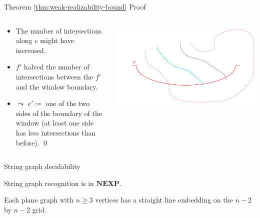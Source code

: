 \documentclass[10pt,aspectratio=169]{beamer}
\theoremstyle{plain}
\begin{document}
\begin{frame}{Theorem \ref{thm:weak-realizability-bound} Proof}
    \begin{columns}
    \begin{column}{0.35\textwidth}
        \begin{itemize}
            \item The number of intersections along \(e\) might have increased.
            \item<2-> \(f'\) halved the number of intersections between the \(f'\) and the window boundary. 
            \item<3-> \(\leadsto\) \(e' \coloneqq\) one of the two sides of the boundary of the window (at least one side has less intersections than before). \qed
        \end{itemize}
    \end{column}
    \begin{column}{0.65\textwidth}
        \begin{center}
            \includegraphics[width=\textwidth]{images/figure-10.pdf}
        \end{center}
    \end{column}
    \end{columns}
\end{frame}

\begin{frame}{String graph decidability}
    \begin{corollary}
        String graph recognition is in \(\mathbf{NEXP}\).
        \label{cor:decidability}
    \end{corollary}
    \begin{theorem}[Schnyder]
        Each plane graph with \(n \geq 3\) vertices has a straight line embedding on the \(n-2\) by \(n-2\) grid.
    \end{theorem}
\end{frame}
\end{document}

